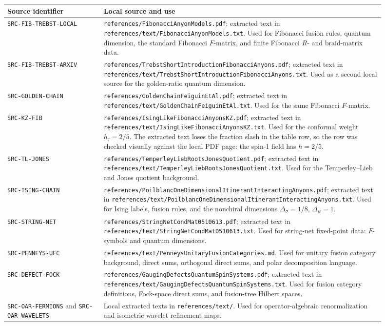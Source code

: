 \documentclass[11pt]{article}
\begin{document}
\begin{longtable}{p{0.23\linewidth}p{0.67\linewidth}}
\textbf{Source identifier} & \textbf{Local source and use} \\
\hline
\texttt{SRC-FIB-TREBST-LOCAL} &
\texttt{references/FibonacciAnyonModels.pdf}; extracted text in
\texttt{references/text/FibonacciAnyonModels.txt}. Used for Fibonacci fusion
rules, quantum dimension, the standard Fibonacci \(F\)-matrix, and finite
Fibonacci \(R\)- and braid-matrix data. \\
\texttt{SRC-FIB-TREBST-ARXIV} &
\texttt{references/TrebstShortIntroductionFibonacciAnyons.pdf}; extracted
text in \texttt{references/text/TrebstShortIntroductionFibonacciAnyons.txt}.
Used as a second local source for the golden-ratio quantum dimension. \\
\texttt{SRC-GOLDEN-CHAIN} &
\texttt{references/GoldenChainFeiguinEtAl.pdf}; extracted text in
\texttt{references/text/GoldenChainFeiguinEtAl.txt}. Used for the same
Fibonacci \(F\)-matrix. \\
\texttt{SRC-KZ-FIB} &
\texttt{references/IsingLikeFibonacciAnyonsKZ.pdf}; extracted text in
\texttt{references/text/IsingLikeFibonacciAnyonsKZ.txt}. Used for the
conformal weight \(h_\tau=2/5\). The extracted text loses the fraction slash
in the table row, so the row was checked visually against the local PDF page:
the spin-1 field has \(h=2/5\). \\
\texttt{SRC-TL-JONES} &
\texttt{references/TemperleyLiebRootsJonesQuotient.pdf}; extracted text in
\texttt{references/text/TemperleyLiebRootsJonesQuotient.txt}. Used for the
Temperley--Lieb and Jones quotient background. \\
\texttt{SRC-ISING-CHAIN} &
\texttt{references/PoilblancOneDimensionalItinerantInteractingAnyons.pdf};
extracted text in
\texttt{references/text/PoilblancOneDimensionalItinerantInteractingAnyons.txt}.
Used for Ising labels, fusion rules, and the nonchiral dimensions
\(\Delta_\sigma=1/8\), \(\Delta_\psi=1\). \\
\texttt{SRC-STRING-NET} &
\texttt{references/StringNetCondMat0510613.pdf}; extracted text in
\texttt{references/text/StringNetCondMat0510613.txt}. Used for string-net
fixed-point data: \(F\)-symbols and quantum dimensions. \\
\texttt{SRC-PENNEYS-UFC} &
\texttt{references/text/PenneysUnitaryFusionCategories.md}. Used for unitary
fusion category background, direct sums, orthogonal direct sums, and polar
decomposition language. \\
\texttt{SRC-DEFECT-FOCK} &
\texttt{references/GaugingDefectsQuantumSpinSystems.pdf}; extracted text in
\texttt{references/text/GaugingDefectsQuantumSpinSystems.txt}. Used for
fusion category definitions, Fock-space direct sums, and fusion-tree Hilbert
spaces. \\
\texttt{SRC-OAR-FERMIONS} and \texttt{SRC-OAR-WAVELETS} &
Local extracted texts in \texttt{references/text/}. Used for
operator-algebraic renormalization and isometric wavelet refinement maps. \\
\end{longtable}
\end{document}

